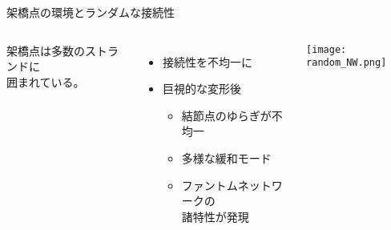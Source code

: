 \begin{columns}[totalwidth=.85\linewidth]
\begin{itembox}[l]{架橋点の環境とランダムな接続性\cite{flory}}
\begin{columns}[totalwidth=\textwidth]
					\small
					架橋点は\alert{多数のストランド}に\\囲まれている。
					\begin{itemize}
						\item 接続性を不均一に
						\item 巨視的な変形後
							\begin{itemize}
								\item \alert{結節点のゆらぎが不均一}
								\item 多様な緩和モード
							\item \alert{ファントムネットワークの\\諸特性が発現}
							\end{itemize}
					\end{itemize}
					\centering
					\texttt{[image: random\_NW.png]}
			\end{columns}
		\end{itembox}
\end{columns}